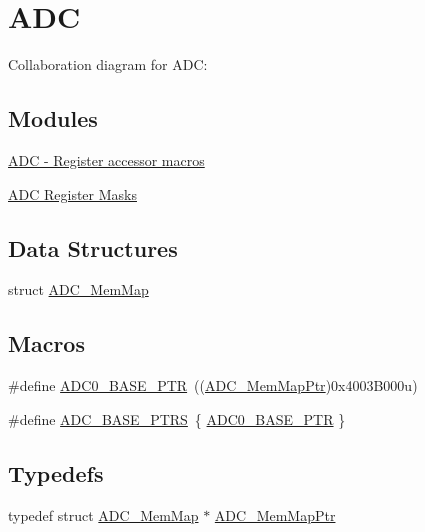 \hypertarget{group___a_d_c___peripheral}{}\section{A\+DC}
\label{group___a_d_c___peripheral}
Collaboration diagram for A\+DC\+:
\subsection*{Modules}
\begin{DoxyCompactItemize}
\item 
\hyperlink{group___a_d_c___register___accessor___macros}{A\+D\+C -\/ Register accessor macros}
\item 
\hyperlink{group___a_d_c___register___masks}{A\+D\+C Register Masks}
\end{DoxyCompactItemize}
\subsection*{Data Structures}
\begin{DoxyCompactItemize}
\item 
struct \hyperlink{struct_a_d_c___mem_map}{A\+D\+C\+\_\+\+Mem\+Map}
\end{DoxyCompactItemize}
\subsection*{Macros}
\begin{DoxyCompactItemize}
\item 
\#define \hyperlink{group___a_d_c___peripheral_ga6cec2f227a3a37a9fccaa830740f1f5e}{A\+D\+C0\+\_\+\+B\+A\+S\+E\+\_\+\+P\+TR}~((\hyperlink{group___a_d_c___peripheral_ga1673c677bf7c0ca339c8563e06de75fa}{A\+D\+C\+\_\+\+Mem\+Map\+Ptr})0x4003\+B000u)
\item 
\#define \hyperlink{group___a_d_c___peripheral_gaaa8175a3a2f4efaceeed5bd26c0b2d3f}{A\+D\+C\+\_\+\+B\+A\+S\+E\+\_\+\+P\+T\+RS}~\{ \hyperlink{group___a_d_c___peripheral_ga6cec2f227a3a37a9fccaa830740f1f5e}{A\+D\+C0\+\_\+\+B\+A\+S\+E\+\_\+\+P\+TR} \}
\end{DoxyCompactItemize}
\subsection*{Typedefs}
\begin{DoxyCompactItemize}
\item 
typedef struct \hyperlink{struct_a_d_c___mem_map}{A\+D\+C\+\_\+\+Mem\+Map} $\ast$ \hyperlink{group___a_d_c___peripheral_ga1673c677bf7c0ca339c8563e06de75fa}{A\+D\+C\+\_\+\+Mem\+Map\+Ptr}
\end{DoxyCompactItemize}


